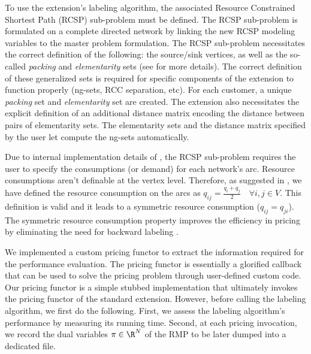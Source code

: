 To use the \vrpsolver{} extension's labeling algorithm,
the associated Resource Constrained Shortest Path (RCSP) sub-problem must be defined.
The RCSP sub-problem is formulated on a complete directed network by
linking the new RCSP modeling variables to the master problem formulation.
The RCSP sub-problem necessitates the correct definition of the following:
the source/sink vertices, as well as the so-called \textit{packing} and \textit{elementarity} sets
(see \cite{pessoa2020generic} for more details).
The correct definition of these generalized sets is required
for specific components  of the \vrpsolver{} extension to function properly (ng-sets, RCC separation, etc).
For each customer, a unique \textit{packing} set and \textit{elementarity} set are created.
The \vrpsolver{} extension also necessitates the explicit definition of an additional
distance matrix encoding the distance between pairs of elementarity sets.
The elementarity sets and the distance matrix specified by the user
let \bapcod{} compute the ng-sets automatically.

Due to internal implementation details of \bapcod{},
the RCSP sub-problem requires the user to specify the consumptions (or demand) for each network's arc.
Resource consumptions aren't definable at the vertex level.
Therefore, as suggested in \textcite{pessoa2020generic}, we have defined the resource consumption
on the arcs as $q_{ij} = \frac{q_{i} + q_{j}}{2} \quad \forall i, j \in V$.
This definition is valid and it leads to a symmetric resource consumption ($q_{ij} = q_{ji}$).
The symmetric resource consumption property improves the efficiency in pricing
by eliminating the need for backward labeling \parencite{pessoa2020generic}.

We implemented a custom pricing functor to extract the information
required for the performance evaluation.
The pricing functor is essentially a glorified callback
that can be used to solve the pricing problem through user-defined custom code.
Our pricing functor is a simple stubbed implementation
that ultimately invokes the pricing functor of the standard \vrpsolver{} extension.
However, before calling the labeling algorithm, we first do the following.
First, we assess the labeling algorithm's performance by measuring its running time.
Second, at each pricing invocation, we record the dual variables $\pi \in \R^N$ of the RMP
to be later dumped into a dedicated file.

